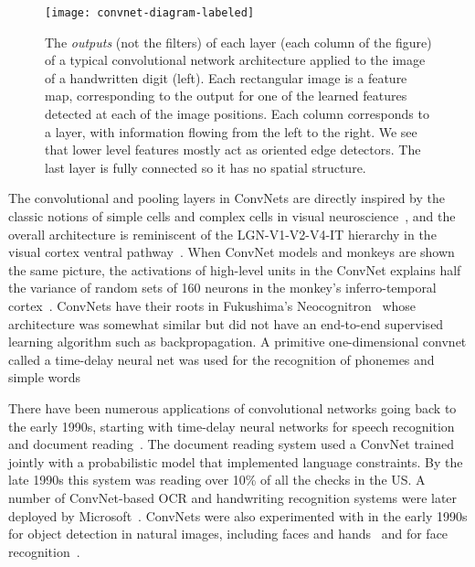 \documentclass[10pts]{article}
\newcommand{\citep}[1]{\cite{#1}}
\begin{document}
\begin{figure}[b]
\vspace{-4mm}
\begin{center}
  \texttt{[image: convnet-diagram-labeled]}
\end{center}
\vspace{-3mm}
\caption{The {\em outputs} (not the filters) of each layer (each column of the figure) 
of a typical convolutional network architecture
applied to the image of a handwritten digit (left). Each rectangular
image is a feature map, corresponding to the output for one of the learned features 
detected at each of the image positions.
Each column corresponds to a layer, with information flowing from the left to
the right. We see that lower level features mostly act as oriented edge detectors.
The last layer is fully connected so it has no spatial structure.
}
\vspace{-2mm}
\label{fig:convnet}
\end{figure}

The convolutional and pooling layers in ConvNets are directly inspired
by the classic notions of simple cells and complex cells in visual
neuroscience~\citep{Hubel62}, and the overall architecture is
reminiscent of the LGN-V1-V2-V4-IT hierarchy in the visual cortex 
ventral pathway~\citep{Felleman+VanEssen-1991}. When ConvNet models and
monkeys are shown the same picture, the activations of high-level
units in the ConvNet explains half the variance of random sets of 160
neurons in the monkey's
inferro-temporal cortex~\citep{cadieu-plos-2014}. ConvNets have their roots
in Fukushima's Neocognitron~\citep{fukushima-82} whose architecture
was somewhat similar but did not have an end-to-end supervised
learning algorithm such as backpropagation. 
A primitive one-dimensional convnet called a time-delay
neural net was used for the recognition of phonemes and simple 
words~\cite{Waibel89b,bottou-89}

There have been numerous applications of convolutional networks going
back to the early 1990s, starting with time-delay neural networks for
speech recognition~\citep{Waibel89b} and document reading~\citep{lecun-98}. 
The document reading system used a ConvNet trained jointly with
a probabilistic model that implemented language constraints. By the
late 1990s this system was reading over 10\% of all the checks in the
US. A number of ConvNet-based OCR and handwriting recognition systems
were later deployed by
Microsoft~\citep{simard-03-small}.
ConvNets
were also experimented with in the early 1990s for object detection 
in natural images, including faces and
hands~\cite{vaillant-monrocq-lecun-94,nowlan-platt-95} and for face
recognition~\cite{lawrence-tnn-1997}.
\end{document}
